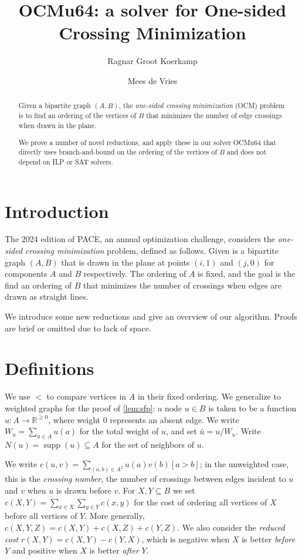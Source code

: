 \documentclass[a4paper,UKenglish,cleveref, autoref, thm-restate]{lipics-v2021}
\title{OCMu64: a solver for One-sided Crossing Minimization} %
\author{Ragnar {Groot Koerkamp}}{ETH Zurich, Switzerland}{ragnar.grootkoerkamp@gmail.com}{https://orcid.org/0000-0002-2091-1237}{}%
\author{Mees de Vries}{Unaffiliated, Netherlands}{meesdevries@protonmail.com}{}{}
\DeclareMathOperator{\supp}{supp}
\begin{document}
\maketitle

\begin{abstract}
  Given a bipartite graph $(A,B)$, the \emph{one-sided crossing minimization}
  (OCM) problem is to find an ordering of the vertices of $B$ that minimizes the
  number of edge crossings when drawn in the plane.

  We prove a number of novel reductions, and apply these in our solver OCMu64
  that directly uses branch-and-bound on the ordering of the vertices of $B$ and
  does not depend on ILP or SAT solvers.
\end{abstract}

\section{Introduction}

The 2024 edition of PACE, an annual optimization challenge, considers the
\emph{one-sided crossing minimization} problem, defined as follows.
Given is a bipartite graph $(A, B)$ that is drawn in the plane at points
$(i, 1)$ and $(j,0)$ for components $A$ and $B$ respectively. The ordering of $A$
is fixed, and the goal is the find an ordering of $B$ that minimizes the number of
crossings when edges are drawn as straight lines.

We introduce some new reductions and give an overview of our algorithm. Proofs are brief or
omitted due to lack of space.

\section{Definitions}
We use $<$ to compare vertices in $A$ in their fixed ordering. We generalize to weighted graphs
for the proof of \cref{lem:sfp}: a node $u \in B$ is taken to be a function $u: A \to \mathbb
R^{\geq 0}$, where weight 0 represents an absent edge. We write $W_u = \sum_{a \in A}u(a)$ for
the total weight of $u$, and set $\bar u = u/W_u$. Write $N(u) = \supp(u) \subseteq A$ for the
set of neighbors of $u$.

We write $c(u, v) = \sum_{(a, b) \in A^2}
u(a)v(b)[a > b]$; in the unweighted case, this is the \emph{crossing number}, the number of
crossings between edges incident to $u$ and $v$ when $u$ is drawn before $v$.  For
$X,Y\subseteq B$ we set $c(X,Y) = \sum_{x\in X}\sum_{y\in Y} c(x,y)$ for the cost of ordering
all vertices of $X$ before all vertices of $Y$. More generally, $c(X,Y,Z) = c(X, Y) + c(X, Z) +
c(Y, Z)$. We also consider the \emph{reduced cost} $r(X,Y) = c(X, Y) - c(Y, X)$, which is
negative when $X$ is better \emph{before} $Y$ and positive when $X$ is better \emph{after} $Y$.
\end{document}
